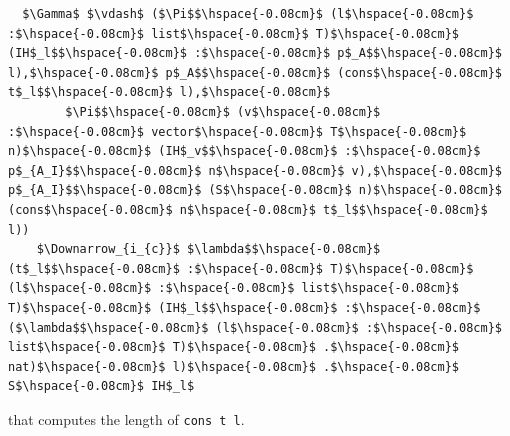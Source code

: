 \begin{lstlisting}
  $\Gamma$ $\vdash$ ($\Pi$$\hspace{-0.08cm}$ (l$\hspace{-0.08cm}$ :$\hspace{-0.08cm}$ list$\hspace{-0.08cm}$ T)$\hspace{-0.08cm}$ (IH$_l$$\hspace{-0.08cm}$ :$\hspace{-0.08cm}$ p$_A$$\hspace{-0.08cm}$ l),$\hspace{-0.08cm}$ p$_A$$\hspace{-0.08cm}$ (cons$\hspace{-0.08cm}$ t$_l$$\hspace{-0.08cm}$ l),$\hspace{-0.08cm}$
        $\Pi$$\hspace{-0.08cm}$ (v$\hspace{-0.08cm}$ :$\hspace{-0.08cm}$ vector$\hspace{-0.08cm}$ T$\hspace{-0.08cm}$ n)$\hspace{-0.08cm}$ (IH$_v$$\hspace{-0.08cm}$ :$\hspace{-0.08cm}$ p$_{A_I}$$\hspace{-0.08cm}$ n$\hspace{-0.08cm}$ v),$\hspace{-0.08cm}$ p$_{A_I}$$\hspace{-0.08cm}$ (S$\hspace{-0.08cm}$ n)$\hspace{-0.08cm}$ (cons$\hspace{-0.08cm}$ n$\hspace{-0.08cm}$ t$_l$$\hspace{-0.08cm}$ l))
    $\Downarrow_{i_{c}}$ $\lambda$$\hspace{-0.08cm}$ (t$_l$$\hspace{-0.08cm}$ :$\hspace{-0.08cm}$ T)$\hspace{-0.08cm}$ (l$\hspace{-0.08cm}$ :$\hspace{-0.08cm}$ list$\hspace{-0.08cm}$ T)$\hspace{-0.08cm}$ (IH$_l$$\hspace{-0.08cm}$ :$\hspace{-0.08cm}$ ($\lambda$$\hspace{-0.08cm}$ (l$\hspace{-0.08cm}$ :$\hspace{-0.08cm}$ list$\hspace{-0.08cm}$ T)$\hspace{-0.08cm}$ .$\hspace{-0.08cm}$ nat)$\hspace{-0.08cm}$ l)$\hspace{-0.08cm}$ .$\hspace{-0.08cm}$ S$\hspace{-0.08cm}$ IH$_l$
\end{lstlisting}
that computes the length of \lstinline{cons t l}.

